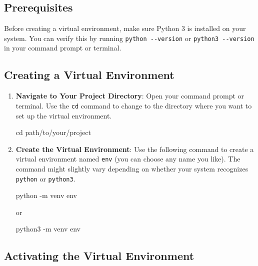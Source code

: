 \documentclass[
  letterpaper,
  DIV=11,
  numbers=noendperiod]{scrreprt}
\newenvironment{Shaded}{\begin{snugshade}}{\end{snugshade}}
\newcommand{\AttributeTok}[1]{\textcolor[rgb]{0.40,0.45,0.13}{#1}}
\newcommand{\BuiltInTok}[1]{\textcolor[rgb]{0.00,0.23,0.31}{#1}}
\newcommand{\ExtensionTok}[1]{\textcolor[rgb]{0.00,0.23,0.31}{#1}}
\newcommand{\NormalTok}[1]{\textcolor[rgb]{0.00,0.23,0.31}{#1}}
\begin{document}
\subsection{Prerequisites}\label{prerequisites}

Before creating a virtual environment, make sure Python 3 is installed
on your system. You can verify this by running
\texttt{python\ -\/-version} or \texttt{python3\ -\/-version} in your
command prompt or terminal.

\subsection{Creating a Virtual
Environment}\label{creating-a-virtual-environment}

\begin{enumerate}
\def\labelenumi{\arabic{enumi}.}
\item
  \textbf{Navigate to Your Project Directory}: Open your command prompt
  or terminal. Use the \texttt{cd} command to change to the directory
  where you want to set up the virtual environment.

\begin{Shaded}
\begin{Highlighting}[]
\BuiltInTok{cd}\NormalTok{ path/to/your/project}
\end{Highlighting}
\end{Shaded}
\item
  \textbf{Create the Virtual Environment}: Use the following command to
  create a virtual environment named \texttt{env} (you can choose any
  name you like). The command might slightly vary depending on whether
  your system recognizes \texttt{python} or \texttt{python3}.

\begin{Shaded}
\begin{Highlighting}[]
\ExtensionTok{python} \AttributeTok{{-}m}\NormalTok{ venv env}
\end{Highlighting}
\end{Shaded}

  or

\begin{Shaded}
\begin{Highlighting}[]
\ExtensionTok{python3} \AttributeTok{{-}m}\NormalTok{ venv env}
\end{Highlighting}
\end{Shaded}
\end{enumerate}

\subsection{Activating the Virtual
Environment}\label{activating-the-virtual-environment}
\end{document}
